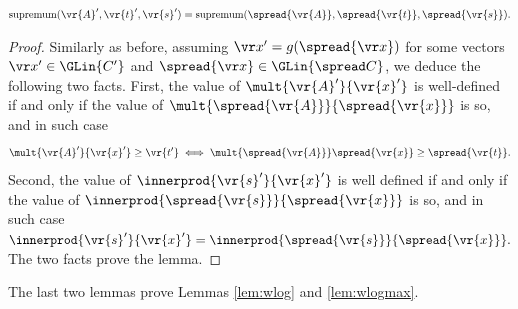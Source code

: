 \begin{lemma}\label{lem:equivariant sys}
$
\textnormal{supremum}(\vr{A}',\vr{t}',\vr{s}') =
\textnormal{supremum}(\spread{\vr{A}},\spread{\vr{t}},\spread{\vr{s}}).
$
\end{lemma}
\begin{proof}
Similarly as before,
assuming $\vr x' = g(\spread{\vr x})$ for some vectors $\vr x' \in \GLin{C'}$ and $\spread{\vr x} \in \GLin{\spread C}$,
we deduce the following two facts.
First,
the value of $\mult {\vr{A}'}  {\vr{x}'}$ is well-defined if and only if
the value of $\mult{\spread{\vr{A}}} {\spread{\vr{x}}}$ is so, and in such case
%
\[
\mult {\vr{A}'}  {\vr{x}'} \geq \vr{t'} \iff
\mult{\spread{\vr{A}}} \spread{{\vr{x}}} \geq \spread{\vr{t}}.
\]
Second,
the value of $\innerprod {\vr{s}'}  {\vr{x}'}$ is well defined if and only if 
the value of $\innerprod {\spread{\vr{s}}} {\spread{\vr{x}}}$ is so, and in such case
$
\innerprod {\vr{s}'}  {\vr{x}'} = \innerprod {\spread{\vr{s}}} {\spread{\vr{x}}}.
$
The two facts prove the lemma.
%
%
%
%
%
\end{proof}

The last two lemmas prove Lemmas \ref{lem:wlog} and \ref{lem:wlogmax}.
%



